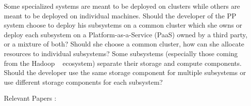 Some specialized systems are meant to be deployed on clusters while others are meant to be deployed on individual machines. Should the developer of the PP system choose to deploy his subsystems on a common cluster which she owns or deploy each subsystem on a Platform-as-a-Service (PaaS) owned by a third party, or a mixture of both? Should she choose a common cluster, how can she allocate resources to individual subsystems? Some subsystems (especially those coming from the Hadoop ~\cite{Shvachko2010} ecosystem) separate their storage and compute components. Should the developer use the same storage component for multiple subsystems or use different storage components for each subsystem?

Relevant Papers : ~\cite{bugiotti2015} ~\cite{LeFevre2014} ~\cite{Lim2013}  ~\cite{Sellami2013}